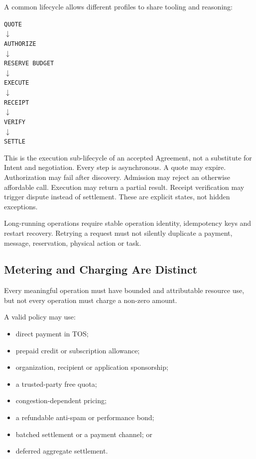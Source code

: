 \documentclass[11pt,oneside]{article}
\begin{document}
A common lifecycle allows different profiles to share tooling and reasoning:

\begin{center}
\texttt{QUOTE}\\
$\downarrow$\\
\texttt{AUTHORIZE}\\
$\downarrow$\\
\texttt{RESERVE BUDGET}\\
$\downarrow$\\
\texttt{EXECUTE}\\
$\downarrow$\\
\texttt{RECEIPT}\\
$\downarrow$\\
\texttt{VERIFY}\\
$\downarrow$\\
\texttt{SETTLE}
\end{center}

This is the execution sub-lifecycle of an accepted Agreement, not a substitute for Intent and
negotiation. Every step is asynchronous. A quote may expire. Authorization may fail after discovery.
Admission may reject an otherwise affordable call. Execution may return a partial result.
Receipt verification may trigger dispute instead of settlement. These are explicit states,
not hidden exceptions.

Long-running operations require stable operation identity, idempotency keys and restart
recovery. Retrying a request must not silently duplicate a payment, message, reservation,
physical action or task.

\subsection{Metering and Charging Are Distinct}

Every meaningful operation must have bounded and attributable resource use, but not every
operation must charge a non-zero amount.

A valid policy may use:

\begin{itemize}
  \item direct payment in TOS;
  \item prepaid credit or subscription allowance;
  \item organization, recipient or application sponsorship;
  \item a trusted-party free quota;
  \item congestion-dependent pricing;
  \item a refundable anti-spam or performance bond;
  \item batched settlement or a payment channel; or
  \item deferred aggregate settlement.
\end{itemize}
\end{document}
